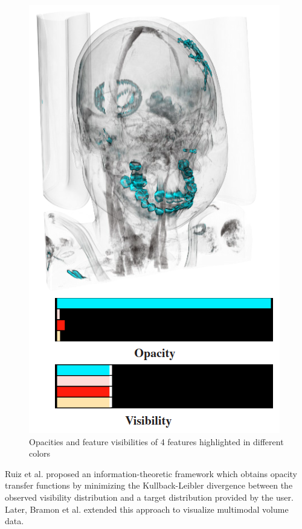 \documentclass{egpubl}
\begin{document}
\begin{figure}
\begin{minipage}{.24\textwidth}
		\includegraphics[width=1\linewidth]{images/wang_efficient_2011_b}
	\end{minipage}
	\caption{Opacities and feature visibilities of 4 features highlighted in different colors \cite{wang_efficient_2011}}
	\label{fig:wang_efficient_2011}
\end{figure}

Ruiz et al. \cite{ruiz_automatic_2011} proposed an information-theoretic framework which obtains opacity transfer functions by minimizing the Kullback-Leibler divergence between the observed visibility distribution and a target distribution provided by the user. Later, Bramon et al. \cite{bramon_information_2013} extended this approach to visualize multimodal volume data.
\end{document}
